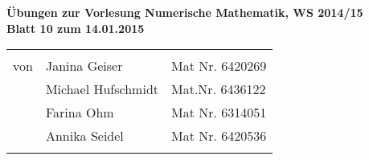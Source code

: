 \documentclass[11pt]{article}
\begin{document}
\begin{center}
\textbf{
Übungen zur Vorlesung Numerische Mathematik, WS 2014/15\\
Blatt 10 zum 14.01.2015\\
}

\begin{tabular}{lll}
& \\
von & Janina Geiser & Mat Nr. 6420269\\
& Michael Hufschmidt & Mat.Nr. 6436122\\
& Farina Ohm & Mat Nr. 6314051\\
& Annika Seidel & Mat Nr. 6420536\\
\\
\hline
\end{tabular}
\end{center}






\end{document}
